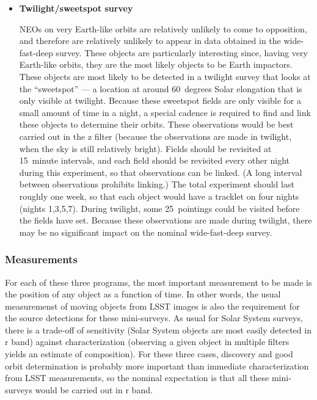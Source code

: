 \begin{itemize}
\item{{\bf Twilight/sweetspot survey}}

NEOs on very Earth-like orbits are relatively
unlikely to come to opposition, and therefore
are relatively unlikely to appear in data
obtained in the wide-fast-deep survey.
These objects are particularly interesting
since, having very Earth-like orbits, they
are the most likely objects to be Earth
impactors.
These objects are most likely to be detected
in a twilight survey that looks at the ``sweetspot'' --- 
a location at around 60~degrees Solar
elongation that is only visible at twilight.
Because these sweetspot fields are only visible
for a small amount of time in a night, a special
cadence is required to find and link these objects
to determine their orbits.
These observations would be best carried out
in the z filter (because the observations are
made in twilight, when the sky is still relatively
bright). Fields should be revisited at 15~minute 
intervals, and each field should be revisited
every other night during this experiment, so that
observations can be linked. 
(A long interval
between observations prohibits linking.)
The total experiment
should last roughly one week, so that each
object would have a tracklet on four nights
(nights 1,3,5,7).
During twilight, some 25~pointings could be visited
before the fields have set.
Because these observations are made during twilight,
there may be no significant impact on the 
nominal wide-fast-deep survey.
\end{itemize}

\subsubsection{Measurements}

For each of these three programs, the most important measurement
to be made is the position of any object as a function of time.
In other words, the usual measuremenst of moving
objects from LSST images is also the requirement for
the source detections for these mini-surveys. As usual
for Solar System surveys, there is a trade-off of
sensitivity (Solar System objects are most easily
detected in r band) against characterization (observing
a given object in multiple filters yields an estimate
of composition). For these three cases, discovery and
good orbit determination is probably more important than
immediate characterization from LSST measurements,
so the nominal expectation is that all these mini-surveys
would be carried out in r band.


